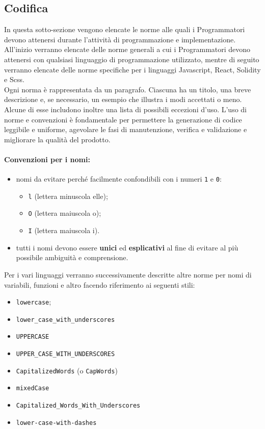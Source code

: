 \documentclass[NormeDiProgetto.tex]{subfiles}
\begin{document}
\subsection{Codifica}
In questa sotto-sezione vengono elencate le norme alle quali i Programmatori devono attenersi durante l'attività di programmazione e implementazione.\\
All'inizio verranno elencate delle norme generali a cui i Programmatori devono attenersi con qualsiasi linguaggio di programmazione utilizzato, mentre di seguito verranno elencate delle norme specifiche per i linguaggi Javascript, React, Solidity e Scss.\\
Ogni norma è rappresentata da un paragrafo. Ciascuna ha un titolo, una breve descrizione e, se necessario, un esempio che illustra i modi accettati o meno. Alcune di esse includono inoltre una lista di possibili eccezioni d'uso. L'uso di norme e convenzioni è fondamentale per permettere la generazione di codice leggibile e uniforme, agevolare le fasi di manutenzione, verifica e validazione e migliorare la qualità del prodotto.

\paragraph*{Convenzioni per i nomi: }
\begin{itemize}
	\item nomi da evitare perché facilmente confondibili con i numeri \texttt{1} e \texttt{0}:
	\begin{itemize}
		\item \texttt{l} (lettera minuscola elle);
		\item \texttt{O} (lettera maiuscola o);
		\item \texttt{I} (lettera maiuscola i).
	\end{itemize}
	\item tutti i nomi devono essere \textbf{unici} ed \textbf{esplicativi} al fine di evitare al più possibile ambiguità e comprensione.
\end{itemize}
Per i vari linguaggi verranno successivamente descritte altre norme per nomi di variabili, funzioni e altro facendo riferimento ai seguenti stili:
\begin{itemize}
	\item \texttt{lowercase};
	\item \texttt{lower\_case\_with\_underscores}
	\item \texttt{UPPERCASE}
	\item \texttt{UPPER\_CASE\_WITH\_UNDERSCORES}
	\item \texttt{CapitalizedWords} (o \texttt{CapWords})
	\item \texttt{mixedCase}
	\item \texttt{Capitalized\_Words\_With\_Underscores}
	\item \texttt{lower-case-with-dashes}	
\end{itemize}
\end{document}
